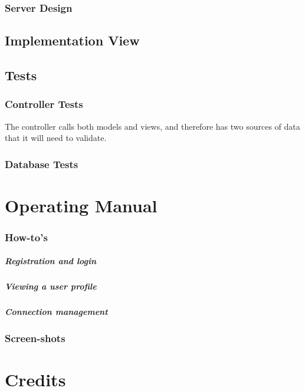 \documentclass[12pt]{report}
\begin{document}
\subsection{Server Design}

\section{Implementation View}

\section{Tests}

\subsection{Controller Tests}
The controller calls both models and views, and therefore has two sources of data that it will need to validate.

\subsection{Database Tests}


\chapter{Operating Manual}
\subsection{How-to's}
\paragraph{Registration and login}
\paragraph{Viewing a user profile}
\paragraph{Connection management}

\subsection{Screen-shots}

\chapter{Credits}
\end{document}
